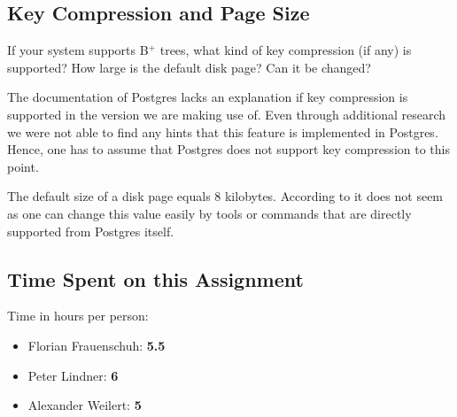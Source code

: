 \documentclass[11pt]{scrartcl}
\begin{document}
\subsection{Key Compression and Page Size}

If your system supports B$^+$ trees, what kind of key compression (if any) is supported?
How large is the default disk page?
Can it be changed?

The documentation of Postgres lacks an explanation if key compression is supported in the version we are making use of.
Even through additional research we were not able to find any hints that this feature is implemented in Postgres.
Hence, one has to assume that Postgres does not support key compression to this point.

The default size of a disk page equals 8 kilobytes.
According to \cite{PostgreSQL2024DiskUsage} it does not seem as one can change this value easily by tools or commands
that are directly supported from Postgres itself.

\subsection*{Time Spent on this Assignment}

Time in hours per person:
\begin{itemize}
  \item Florian Frauenschuh: \textbf{5.5}
  \item Peter Lindner: \textbf{6}
  \item Alexander Weilert: \textbf{5}
\end{itemize}

\pagebreak

\printbibliography[title=References]
\end{document}
